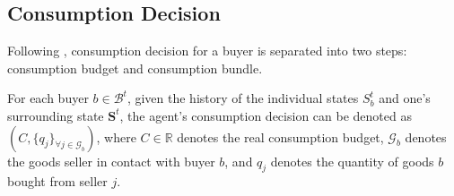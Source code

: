 
\subsection{Consumption Decision}

Following \citet*{HandbookABM}, consumption decision for a buyer is separated into two steps: consumption budget and consumption bundle.
\begin{definition}
   For each buyer $b \in \mathcal{B}^t$, given the history of the individual
   states $S^t_b$ and one's surrounding state $\mathbf{S}^t$, the agent's
   consumption decision can be denoted as $(C, \{q_j\}_{\forall j \in
   \mathcal{G}_b})$, where $C\in \mathbb{R}$ denotes the real consumption
   budget, $\mathcal{G}_b$ denotes the goods seller in contact with buyer $b$,
   and $q_j$ denotes the quantity of goods $b$ bought from seller $j$.
\end{definition}


